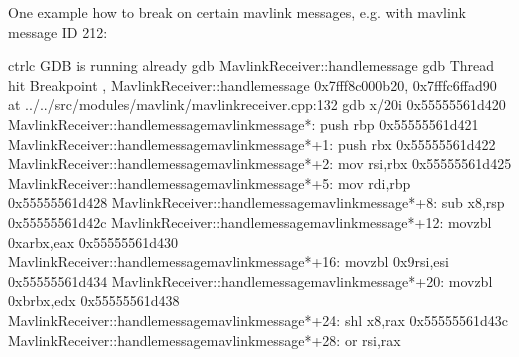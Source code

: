 \documentclass[letterpaper,10pt,english]{sphinxmanual}
\begin{document}
One example how to break on certain mavlink messages, e.g. with mavlink message ID 212:

\begin{sphinxVerbatim}[commandchars=\\\{\}]
\PYGZlt{}ctrl\PYGZhy{}c\PYGZgt{}  GDB is running already
gdb  MavlinkReceiver::handle\PYGZus{}message
gdb 
Thread   hit Breakpoint , MavlinkReceiver::handle\PYGZus{}message 0x7fff8c000b20, 0x7fffc6ffad90
 at ../../src/modules/mavlink/mavlink\PYGZus{}receiver.cpp:132
      
gdb x/20i 
\PYGZgt{} 0x55555561d420 \PYGZlt{}MavlinkReceiver::handle\PYGZus{}message\PYGZus{}\PYGZus{}mavlink\PYGZus{}message*\PYGZgt{}:        push   \PYGZpc{}rbp
   0x55555561d421 \PYGZlt{}MavlinkReceiver::handle\PYGZus{}message\PYGZus{}\PYGZus{}mavlink\PYGZus{}message*+1\PYGZgt{}:      push   \PYGZpc{}rbx
   0x55555561d422 \PYGZlt{}MavlinkReceiver::handle\PYGZus{}message\PYGZus{}\PYGZus{}mavlink\PYGZus{}message*+2\PYGZgt{}:      mov    \PYGZpc{}rsi,\PYGZpc{}rbx
   0x55555561d425 \PYGZlt{}MavlinkReceiver::handle\PYGZus{}message\PYGZus{}\PYGZus{}mavlink\PYGZus{}message*+5\PYGZgt{}:      mov    \PYGZpc{}rdi,\PYGZpc{}rbp
   0x55555561d428 \PYGZlt{}MavlinkReceiver::handle\PYGZus{}message\PYGZus{}\PYGZus{}mavlink\PYGZus{}message*+8\PYGZgt{}:      sub    x8,\PYGZpc{}rsp
   0x55555561d42c \PYGZlt{}MavlinkReceiver::handle\PYGZus{}message\PYGZus{}\PYGZus{}mavlink\PYGZus{}message*+12\PYGZgt{}:     movzbl 0xa\PYGZpc{}rbx,\PYGZpc{}eax
   0x55555561d430 \PYGZlt{}MavlinkReceiver::handle\PYGZus{}message\PYGZus{}\PYGZus{}mavlink\PYGZus{}message*+16\PYGZgt{}:     movzbl 0x9\PYGZpc{}rsi,\PYGZpc{}esi
   0x55555561d434 \PYGZlt{}MavlinkReceiver::handle\PYGZus{}message\PYGZus{}\PYGZus{}mavlink\PYGZus{}message*+20\PYGZgt{}:     movzbl 0xb\PYGZpc{}rbx,\PYGZpc{}edx
   0x55555561d438 \PYGZlt{}MavlinkReceiver::handle\PYGZus{}message\PYGZus{}\PYGZus{}mavlink\PYGZus{}message*+24\PYGZgt{}:     shl    x8,\PYGZpc{}rax
   0x55555561d43c \PYGZlt{}MavlinkReceiver::handle\PYGZus{}message\PYGZus{}\PYGZus{}mavlink\PYGZus{}message*+28\PYGZgt{}:     or     \PYGZpc{}rsi,\PYGZpc{}rax

\end{sphinxVerbatim}
\end{document}

